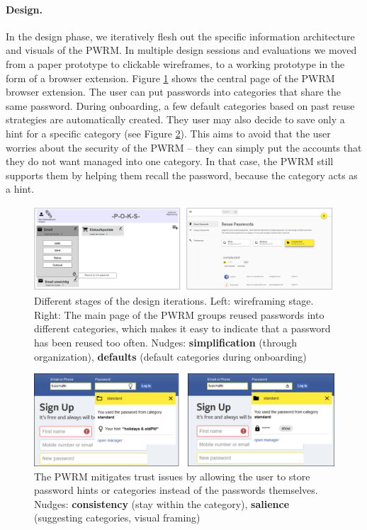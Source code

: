 \paragraph{Design.} 
In the design phase, we iteratively flesh out the specific information architecture and visuals of the PWRM. In multiple design sessions and evaluations we moved from a paper prototype to clickable wireframes, to a working prototype in the form of a browser extension. Figure \ref{fig:pwrm:conceptfinal} shows the central page of the PWRM browser extension. The user can put passwords into categories that share the same password. During onboarding, a few default categories based on past reuse strategies are automatically created. They user may also decide to save only a hint for a specific category (see Figure \ref{fig:pwrm:hintboxes}). This aims to avoid that the user worries about the security of the PWRM -- they can simply put the accounts that they do not want managed into one category. In that case, the PWRM still supports them by helping them recall the password, because the category acts as a hint. 

\begin{figure}[htbp]
	\centering
	\includegraphics[width=\linewidth]{figures/pwrm/concept_final}
	\caption{Different stages of the design iterations. Left: wireframing stage. Right: The main page of the PWRM groups reused passwords into different categories, which makes it easy to indicate that a password has been reused too often. Nudges: \textbf{simplification} (through organization), \textbf{defaults} (default categories during onboarding)}
	\label{fig:pwrm:conceptfinal}
\end{figure}

\begin{figure}[htbp]
	\centering
	\includegraphics[width=\linewidth]{figures/pwrm/hintboxes}
	\caption{The PWRM mitigates trust issues by allowing the user to store password hints or categories instead of the passwords themselves. Nudges: \textbf{consistency} (stay within the category), \textbf{salience} (suggesting categories, visual framing)}
	\label{fig:pwrm:hintboxes}
\end{figure}

